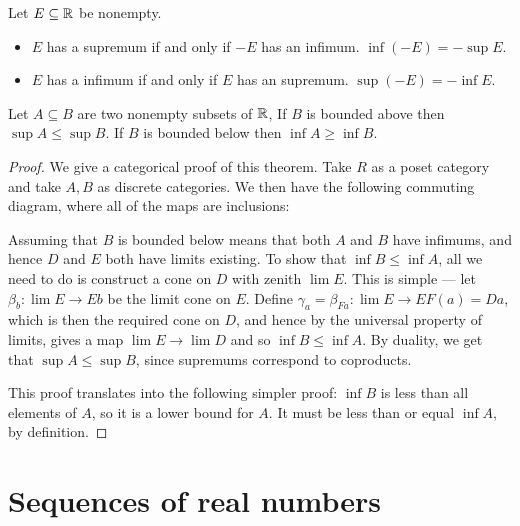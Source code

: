 \begin{theorem}
  Let \(E \subseteq \mathbb{R}\) be nonempty.
  \begin{itemize}
  \item \(E\) has a supremum if and only if \(-E\) has an infimum. \(\inf (-E) = - \sup E\).
  \item \(E\) has a infimum if and only if \(E\) has an supremum. \(\sup (-E) = - \inf E\).
  \end{itemize}
\end{theorem}

\begin{theorem}
  Let \(A \subseteq B\) are two nonempty subsets of \(\mathbb{R}\), If \(B\) is bounded above then \(\sup A \leq \sup B\). If \(B\) is bounded below then \(\inf A \geq \inf B\).
\end{theorem}

\begin{proof}
  We give a categorical proof of this theorem. Take \(R\) as a poset category and take \(A, B\) as discrete categories. We then have the following commuting diagram, where all of the maps are inclusions:
  \begin{centre}
  \end{centre}

  Assuming that \(B\) is bounded below means that both \(A\) and \(B\) have infimums, and hence \(D\) and \(E\) both have limits existing. To show that \(\inf B \leq \inf A\), all we need to do is construct a cone on \(D\) with zenith \(\lim{}{E}\). This is simple --- let \(\beta_{b} : \lim{}{E} \rightarrow E b\) be the limit cone on \(E\). Define \(\gamma_{a} = \beta_{Fa}: \lim{}{E} \rightarrow EF (a) = D a\), which is then the required cone on \(D\), and hence by the universal property of limits, gives a map \(\lim{}{E} \rightarrow \lim{}{D}\) and so \(\inf B \leq \inf A\). By duality, we get that \(\sup A \leq \sup B\), since supremums correspond to coproducts.

  This proof translates into the following simpler proof: \(\inf B\) is less than all elements of \(A\), so it is a lower bound for \(A\). It must be less than or equal \(\inf A\), by definition.
\end{proof}

\section{Sequences of real numbers}

